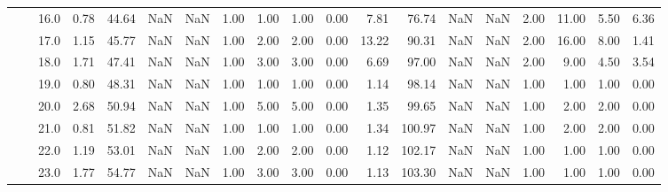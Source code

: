 \begin{tabular}{lllrrrrrrrrrrrrrrrr}
       &     & 16.0 &      0.78 &      44.64 &               NaN &                NaN &  1.00 &   1.00 &             1.00 &                         0.00 &      7.81 &      76.74 &               NaN &                NaN & 2.00 &  11.00 &             5.50 &                         6.36 \\
       &     & 17.0 &      1.15 &      45.77 &               NaN &                NaN &  1.00 &   2.00 &             2.00 &                         0.00 &     13.22 &      90.31 &               NaN &                NaN & 2.00 &  16.00 &             8.00 &                         1.41 \\
       &     & 18.0 &      1.71 &      47.41 &               NaN &                NaN &  1.00 &   3.00 &             3.00 &                         0.00 &      6.69 &      97.00 &               NaN &                NaN & 2.00 &   9.00 &             4.50 &                         3.54 \\
       &     & 19.0 &      0.80 &      48.31 &               NaN &                NaN &  1.00 &   1.00 &             1.00 &                         0.00 &      1.14 &      98.14 &               NaN &                NaN & 1.00 &   1.00 &             1.00 &                         0.00 \\
       &     & 20.0 &      2.68 &      50.94 &               NaN &                NaN &  1.00 &   5.00 &             5.00 &                         0.00 &      1.35 &      99.65 &               NaN &                NaN & 1.00 &   2.00 &             2.00 &                         0.00 \\
       &     & 21.0 &      0.81 &      51.82 &               NaN &                NaN &  1.00 &   1.00 &             1.00 &                         0.00 &      1.34 &     100.97 &               NaN &                NaN & 1.00 &   2.00 &             2.00 &                         0.00 \\
       &     & 22.0 &      1.19 &      53.01 &               NaN &                NaN &  1.00 &   2.00 &             2.00 &                         0.00 &      1.12 &     102.17 &               NaN &                NaN & 1.00 &   1.00 &             1.00 &                         0.00 \\
       &     & 23.0 &      1.77 &      54.77 &               NaN &                NaN &  1.00 &   3.00 &             3.00 &                         0.00 &      1.13 &     103.30 &               NaN &                NaN & 1.00 &   1.00 &             1.00 &                         0.00 \\

\end{tabular}
